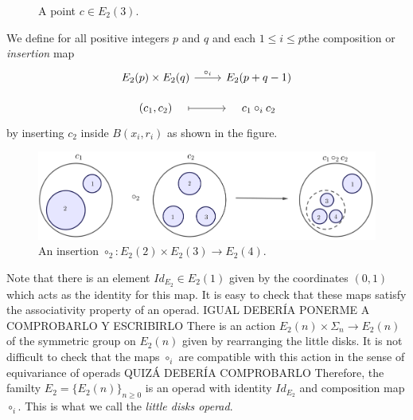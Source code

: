 \documentclass[TFM.tex]{subfiles}
\begin{document}
\begin{figure}[h!]
\caption{A point $c\in E_2(3)$.}
 \end{figure}
 

 
 
 We define for all positive integers $p$ and $q$ and  each $1\leq i\leq p$the composition or \emph{insertion} map 
 \[
 \begin{tikzcd}[row sep=10]
  E_2(p)\times E_2(q)\arrow[r, "\circ_i"] & E_2(p+q-1)\\
  (c_1,c_2)\arrow[r, mapsto, shorten <= 1em, shorten >= 1em] & c_1\circ_i c_2
 \end{tikzcd}
 \]
 by inserting $c_2$ inside $B(x_i,r_i)$ as shown in the figure. 
 
  
  \begin{figure}[h!]
  \centering
\includegraphics[scale=0.3]{Imagenes/insertion}
\caption{An insertion $\circ_2:E_2(2)\times E_2(3)\to E_2(4)$.}
 \end{figure}

Note that there is an element $Id_{E_2}\in E_2(1)$ given by the coordinates $(0,1)$ which acts as the identity for this map. It is easy to check that these maps satisfy the associativity property of an operad. IGUAL DEBERÍA PONERME A COMPROBARLO Y ESCRIBIRLO There is an action $E_2(n)\times \Sigma_n\to E_2(n)$ of the symmetric group on $E_2(n)$ given by rearranging the little disks. It is not difficult to check that the maps $\circ_i$ are compatible with this action in the sense of equivariance of operads QUIZÁ DEBERÍA COMPROBARLO Therefore, the familty $E_2=\{E_2(n)\}_{n\geq 0}$ is an operad with identity $Id_{E_2}$ and composition map $\circ_i$. This is what we call the \emph{little disks operad}.
\end{document}
